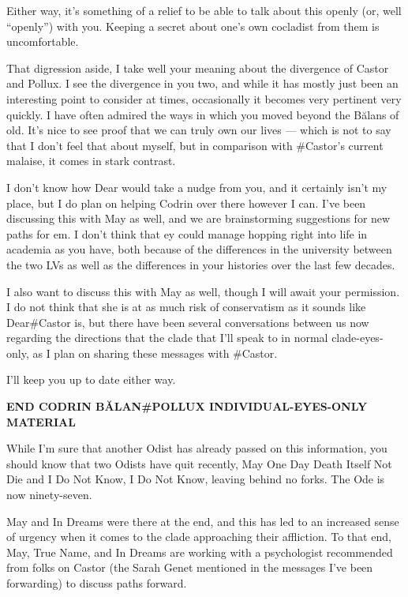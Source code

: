 Either way, it's something of a relief to be able to talk about this openly (or, well ``openly'') with you. Keeping a secret about one's own cocladist from them is uncomfortable.

That digression aside, I take well your meaning about the divergence of Castor and Pollux. I see the divergence in you two, and while it has mostly just been an interesting point to consider at times, occasionally it becomes very pertinent very quickly. I have often admired the ways in which you moved beyond the Bălans of old. It's nice to see proof that we can truly own our lives — which is not to say that I don't feel that about myself, but in comparison with \#Castor's current malaise, it comes in stark contrast.

I don't know how Dear would take a nudge from you, and it certainly isn't my place, but I do plan on helping Codrin over there however I can. I've been discussing this with May as well, and we are brainstorming suggestions for new paths for em. I don't think that ey could manage hopping right into life in academia as you have, both because of the differences in the university between the two LVs as well as the differences in your histories over the last few decades.

I also want to discuss this with May as well, though I will await your permission. I do not think that she is at as much risk of conservatism as it sounds like Dear\#Castor is, but there have been several conversations between us now regarding the directions that the clade that I'll speak to in normal clade-eyes-only, as I plan on sharing these messages with \#Castor.

I'll keep you up to date either way.

\begin{center}
\textbf{END CODRIN BĂLAN\#POLLUX INDIVIDUAL-EYES-ONLY MATERIAL}
\end{center}

While I'm sure that another Odist has already passed on this information, you should know that two Odists have quit recently, May One Day Death Itself Not Die and I Do Not Know, I Do Not Know, leaving behind no forks. The Ode is now ninety-seven.

May and In Dreams were there at the end, and this has led to an increased sense of urgency when it comes to the clade approaching their affliction. To that end, May, True Name, and In Dreams are working with a psychologist recommended from folks on Castor (the Sarah Genet mentioned in the messages I've been forwarding) to discuss paths forward.

